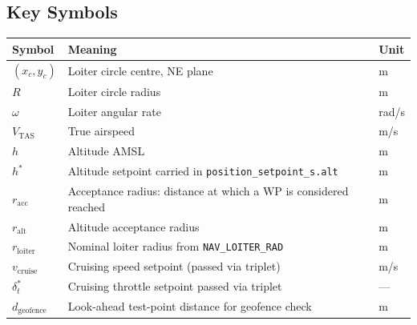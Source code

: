 \documentclass[12pt,a4paper]{article}
\begin{document}
\subsection*{Key Symbols}
\begin{center}\begin{tabular}{lll}\toprule
Symbol & Meaning & Unit \\\midrule
$(x_c, y_c)$ & Loiter circle centre, NE plane & m \\
$R$ & Loiter circle radius & m \\
$\omega$ & Loiter angular rate & rad/s \\
$V_{\text{TAS}}$ & True airspeed & m/s \\
$h$ & Altitude AMSL & m \\
$h^*$ & Altitude setpoint carried in \texttt{position\_setpoint\_s.alt} & m \\
$r_{\text{acc}}$ & Acceptance radius: distance at which a WP is considered reached & m \\
$r_{\text{alt}}$ & Altitude acceptance radius & m \\
$r_{\text{loiter}}$ & Nominal loiter radius from \texttt{NAV\_LOITER\_RAD} & m \\
$v_{\text{cruise}}$ & Cruising speed setpoint (passed via triplet) & m/s \\
$\delta_t^*$ & Cruising throttle setpoint passed via triplet & --- \\
$d_{\text{geofence}}$ & Look-ahead test-point distance for geofence check & m \\
\bottomrule\end{tabular}\end{center}
\end{document}
